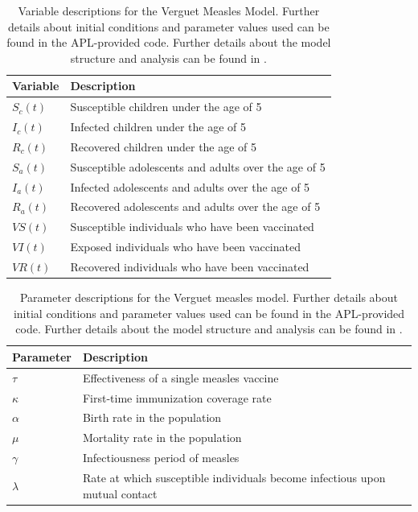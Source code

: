 \documentclass[letter,12pt, usenames,dvipsnames]{article}
\begin{document}
\begin{table}[h!]
\centering
\begin{tabular}{| l | l |}
\hline
Variable & Description \\\hline\hline 
$S_c(t)$ & Susceptible children under the age of 5\\\hline
$I_c(t)$ & Infected children under the age of 5 \\\hline
$R_c(t)$ & Recovered children under the age of 5\\\hline
$S_a(t)$ & Susceptible adolescents and adults over the age of 5\\\hline
$I_a(t)$ & Infected adolescents and adults over the age of 5\\\hline
$R_a(t)$ & Recovered adolescents and adults over the age of 5\\\hline
$VS(t)$ & Susceptible individuals who have been vaccinated\\\hline
$VI(t)$ & Exposed individuals who have been vaccinated\\\hline
$VR(t)$ & Recovered individuals who have been vaccinated\\ \hline
\end{tabular}
\caption{Variable descriptions for the Verguet Measles Model. Further details about initial conditions and parameter values used can be found in the APL-provided code. Further details about the model structure and analysis can be found in \cite{measles}.}
\label{table:MeaslesVariables}
\end{table}

\begin{table}[h!]
\centering
\begin{tabular}{| l | l |}
\hline
Parameter & Description \\\hline\hline 
$\tau$ & Effectiveness of a single measles vaccine\\\hline
$\kappa$ & First-time immunization coverage rate\\\hline
$\alpha$ & Birth rate in the population \\\hline
$\mu$ & Mortality rate in the population\\\hline
$\gamma$ & Infectiousness period of measles\\\hline
$\lambda$ & Rate at which susceptible individuals become infectious upon mutual contact \\\hline
\end{tabular}
\caption{Parameter descriptions for the Verguet measles model. Further details about initial conditions and parameter values used can be found in the APL-provided code. Further details about the model structure and analysis can be found in \cite{measles}.}
\label{table:MeaslesParameters}
\end{table}
\end{document}
